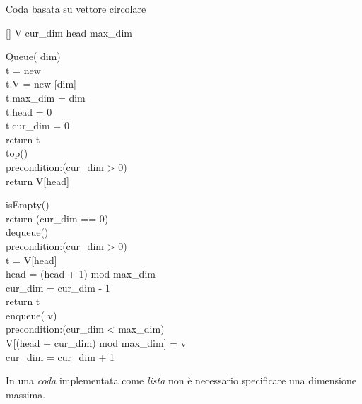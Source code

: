 \newpage
\begin{code}{Coda basata su vettore circolare}
    \begin{minipage}[t]{0.48\textwidth}
        [] V\hfill{}
         cur\_dim\hfill{}
         head\hfill{}
         max\_dim\hfill{}

        \ind{} Queue( dim)\\
             t = new \\
            t.V = new [dim]\\
            t.max\_dim = dim\\
            t.head = 0\\
            t.cur\_dim = 0\\
            return t\\

        \ind{} top()\\
            precondition:(cur\_dim > 0)\\
            return V[head]\\
    \end{minipage}
    \hfill
    \begin{minipage}[t]{0.48\textwidth}
        \ind{} isEmpty()\\
            return (cur\_dim == 0)\\

        \ind{} dequeue()\\
            precondition:(cur\_dim > 0)\\
             t = V[head]\\
            head = (head + 1) mod max\_dim\\
            cur\_dim = cur\_dim - 1\\
            return t\\

        \ind enqueue( v)\\
            precondition:(cur\_dim < max\_dim)\\
            V[(head + cur\_dim) mod max\_dim] = v\\
            cur\_dim = cur\_dim + 1
    \end{minipage}
\end{code}
\begin{note}
    In una \emph{coda} implementata come \emph{lista} non è necessario specificare
    una dimensione massima.
\end{note}